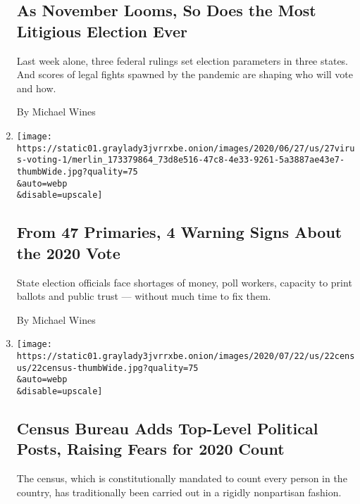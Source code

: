 \begin{enumerate}
{  \subsection{As November Looms, So Does the Most Litigious Election
  Ever}\label{as-november-looms-so-does-the-most-litigious-election-ever}}

  Last week alone, three federal rulings set election parameters in
  three states. And scores of legal fights spawned by the pandemic are
  shaping who will vote and how.

  By Michael Wines
\item
  \href{/2020/06/27/us/2020-primary-election-voting.html}{}

  \texttt{[image: https://static01.graylady3jvrrxbe.onion/images/2020/06/27/us/27virus-voting-1/merlin\_173379864\_73d8e516-47c8-4e33-9261-5a3887ae43e7-thumbWide.jpg?quality=75\\\&auto=webp\\\&disable=upscale]}

  \hypertarget{from-47-primaries-4-warning-signs-about-the-2020-vote}{%
  \subsection{From 47 Primaries, 4 Warning Signs About the 2020
  Vote}\label{from-47-primaries-4-warning-signs-about-the-2020-vote}}

  State election officials face shortages of money, poll workers,
  capacity to print ballots and public trust --- without much time to
  fix them.

  By Michael Wines
\item
  \href{/2020/06/23/us/census-bureau-cogley-korzeniewski.html}{}

  \texttt{[image: https://static01.graylady3jvrrxbe.onion/images/2020/07/22/us/22census/22census-thumbWide.jpg?quality=75\\\&auto=webp\\\&disable=upscale]}

  \hypertarget{census-bureau-adds-top-level-political-posts-raising-fears-for-2020-count}{%
  \subsection{Census Bureau Adds Top-Level Political Posts, Raising
  Fears for 2020
  Count}\label{census-bureau-adds-top-level-political-posts-raising-fears-for-2020-count}}

  The census, which is constitutionally mandated to count every person
  in the country, has traditionally been carried out in a rigidly
  nonpartisan fashion.


\end{enumerate}
